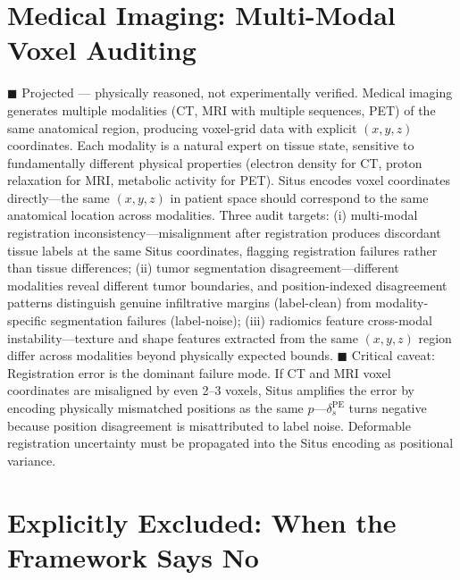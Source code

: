 \documentclass[12pt,a4paper]{article}
\begin{document}
\section{Medical Imaging: Multi-Modal Voxel Auditing}
\label{sec:medical}

\textcolor{projected}{$\blacksquare$ Projected — physically reasoned, not experimentally verified.}
Medical imaging generates multiple modalities (CT, MRI with multiple sequences, PET) of the same anatomical region, producing voxel-grid data with explicit $(x,y,z)$ coordinates. Each modality is a natural expert on tissue state, sensitive to fundamentally different physical properties (electron density for CT, proton relaxation for MRI, metabolic activity for PET). Situs encodes voxel coordinates directly—the same $(x,y,z)$ in patient space should correspond to the same anatomical location across modalities. Three audit targets: (i) multi-modal registration inconsistency—misalignment after registration produces discordant tissue labels at the same Situs coordinates, flagging registration failures rather than tissue differences; (ii) tumor segmentation disagreement\cite{isensee2021}—different modalities reveal different tumor boundaries, and position-indexed disagreement patterns distinguish genuine infiltrative margins (label-clean) from modality-specific segmentation failures (label-noise); (iii) radiomics\cite{gillies2016} feature cross-modal instability—texture and shape features extracted from the same $(x,y,z)$ region differ across modalities beyond physically expected bounds. \textcolor{warning}{$\blacksquare$ Critical caveat}: Registration error is the dominant failure mode. If CT and MRI voxel coordinates are misaligned by even 2--3 voxels, Situs amplifies the error by encoding physically mismatched positions as the same $p$—$\delta_s^{\mathrm{PE}}$ turns negative because position disagreement is misattributed to label noise. Deformable registration uncertainty must be propagated into the Situs encoding as positional variance.

\section{Explicitly Excluded: When the Framework Says No}
\label{sec:excluded}
\end{document}
